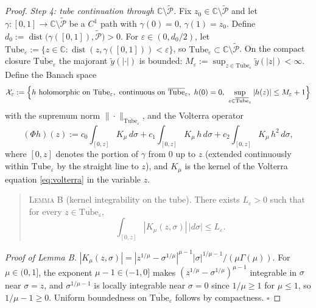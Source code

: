 \documentclass[11pt]{article}
\theoremstyle{definition}
\theoremstyle{remark}
\begin{document}
\begin{proof}
\emph{Step 4: tube continuation through $\mathbb{C}\setminus\widetilde{\mathcal{P}}$.} Fix $z_{0}\in\mathbb{C}\setminus\widetilde{\mathcal{P}}$ and let $\gamma\colon[0,1]\to\mathbb{C}\setminus\widetilde{\mathcal{P}}$ be a $C^{1}$ path with $\gamma(0)=0$, $\gamma(1)=z_{0}$. Define $d_{0}:=\operatorname{dist}\bigl(\gamma([0,1]),\widetilde{\mathcal{P}}\bigr)>0$. For $\varepsilon\in(0,d_{0}/2)$, let $\mathrm{Tube}_{\varepsilon}:=\{z\in\mathbb{C}:\operatorname{dist}(z,\gamma([0,1]))<\varepsilon\}$, so $\mathrm{Tube}_{\varepsilon}\subset\mathbb{C}\setminus\widetilde{\mathcal{P}}$. On the compact closure $\overline{\mathrm{Tube}}_{\varepsilon}$ the majorant $\tilde y(|\cdot|)$ is bounded: $M_{\varepsilon}:=\sup_{z\in\overline{\mathrm{Tube}}_{\varepsilon}}\tilde y(|z|)<\infty$. Define the Banach space
\begin{equation*}
\mathcal{X}_{\varepsilon}:=\Bigl\{h\ \text{holomorphic on }\mathrm{Tube}_{\varepsilon},\ \text{continuous on }\overline{\mathrm{Tube}}_{\varepsilon},\ h(0)=0,\ \sup_{z\in\overline{\mathrm{Tube}}_{\varepsilon}}|h(z)|\le M_{\varepsilon}+1\Bigr\}
\end{equation*}
with the supremum norm $\|\cdot\|_{\overline{\mathrm{Tube}}_{\varepsilon}}$, and the Volterra operator
\begin{equation}
(\Phi h)(z):=c_{0}\!\int_{[0,z]}\!K_{\mu}\,d\sigma
+c_{1}\!\int_{[0,z]}\!K_{\mu}\,h\,d\sigma
+c_{2}\!\int_{[0,z]}\!K_{\mu}\,h^{2}\,d\sigma,
\label{eq:volterra-tube}
\end{equation}
where $[0,z]$ denotes the portion of $\gamma$ from $0$ up to $z$ (extended continuously within $\mathrm{Tube}_{\varepsilon}$ by the straight line to $z$), and $K_{\mu}$ is the kernel of the Volterra equation \eqref{eq:volterra} in the variable $z$.

\begin{quote}
\textsc{Lemma B} (kernel integrability on the tube)\textsc{.} There exists $L_{\varepsilon}>0$ such that for every $z\in\overline{\mathrm{Tube}}_{\varepsilon}$,
\begin{equation*}
\int_{[0,z]}|K_{\mu}(z,\sigma)|\,|d\sigma|\le L_{\varepsilon}.
\end{equation*}
\end{quote}

\emph{Proof of Lemma B.} $|K_{\mu}(z,\sigma)|=|z^{1/\mu}-\sigma^{1/\mu}|^{\mu-1}|\sigma|^{1/\mu-1}/(\mu\Gamma(\mu))$. For $\mu\in(0,1]$, the exponent $\mu-1\in(-1,0]$ makes $(z^{1/\mu}-\sigma^{1/\mu})^{\mu-1}$ integrable in $\sigma$ near $\sigma=z$, and $\sigma^{1/\mu-1}$ is locally integrable near $\sigma=0$ since $1/\mu\ge 1$ for $\mu\le 1$, so $1/\mu-1\ge 0$. Uniform boundedness on $\overline{\mathrm{Tube}}_{\varepsilon}$ follows by compactness. \hfill$\square$


\end{proof}
\end{document}
